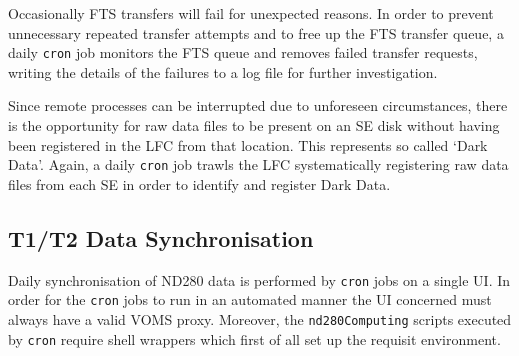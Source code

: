 \documentclass[11pt]{article}
\begin{document}
Occasionally FTS transfers will fail for unexpected reasons. In order
to prevent unnecessary repeated transfer attempts and to free up the
FTS transfer queue, a daily \verb+cron+ job monitors the FTS queue and
removes failed transfer requests, writing the details of the failures
to a log file for further investigation.

Since remote processes can be interrupted due to unforeseen
circumstances, there is the opportunity for raw data files to be
present on an SE disk without having been registered in the LFC from
that location. This represents so called `Dark Data'. Again, a daily
\verb+cron+ job trawls the LFC systematically registering raw data
files from each SE in order to identify and register Dark Data.

\subsection{T1/T2 Data Synchronisation}

Daily synchronisation of ND280 data is performed by \verb+cron+ jobs on
a single UI. In order for the \verb+cron+ jobs to run in an automated
manner the UI concerned must always have a valid VOMS proxy. Moreover,
the \verb+nd280Computing+ scripts executed by \verb+cron+ require shell
wrappers which first of all set up the requisit environment.
\end{document}
